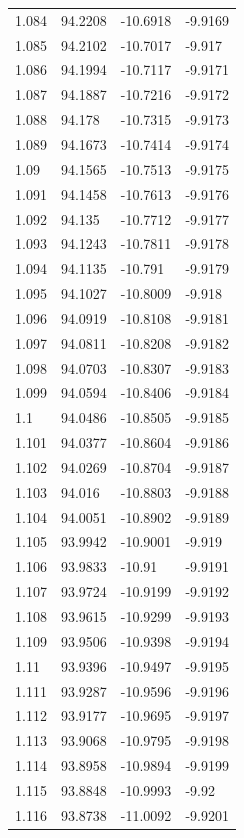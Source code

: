 \begin{tabular}{llll}
1.084 & 94.2208 & -10.6918 & -9.9169 \\
1.085 & 94.2102 & -10.7017 & -9.917 \\
1.086 & 94.1994 & -10.7117 & -9.9171 \\
1.087 & 94.1887 & -10.7216 & -9.9172 \\
1.088 & 94.178 & -10.7315 & -9.9173 \\
1.089 & 94.1673 & -10.7414 & -9.9174 \\
1.09 & 94.1565 & -10.7513 & -9.9175 \\
1.091 & 94.1458 & -10.7613 & -9.9176 \\
1.092 & 94.135 & -10.7712 & -9.9177 \\
1.093 & 94.1243 & -10.7811 & -9.9178 \\
1.094 & 94.1135 & -10.791 & -9.9179 \\
1.095 & 94.1027 & -10.8009 & -9.918 \\
1.096 & 94.0919 & -10.8108 & -9.9181 \\
1.097 & 94.0811 & -10.8208 & -9.9182 \\
1.098 & 94.0703 & -10.8307 & -9.9183 \\
1.099 & 94.0594 & -10.8406 & -9.9184 \\
1.1 & 94.0486 & -10.8505 & -9.9185 \\
1.101 & 94.0377 & -10.8604 & -9.9186 \\
1.102 & 94.0269 & -10.8704 & -9.9187 \\
1.103 & 94.016 & -10.8803 & -9.9188 \\
1.104 & 94.0051 & -10.8902 & -9.9189 \\
1.105 & 93.9942 & -10.9001 & -9.919 \\
1.106 & 93.9833 & -10.91 & -9.9191 \\
1.107 & 93.9724 & -10.9199 & -9.9192 \\
1.108 & 93.9615 & -10.9299 & -9.9193 \\
1.109 & 93.9506 & -10.9398 & -9.9194 \\
1.11 & 93.9396 & -10.9497 & -9.9195 \\
1.111 & 93.9287 & -10.9596 & -9.9196 \\
1.112 & 93.9177 & -10.9695 & -9.9197 \\
1.113 & 93.9068 & -10.9795 & -9.9198 \\
1.114 & 93.8958 & -10.9894 & -9.9199 \\
1.115 & 93.8848 & -10.9993 & -9.92 \\
1.116 & 93.8738 & -11.0092 & -9.9201 \\

\end{tabular}
